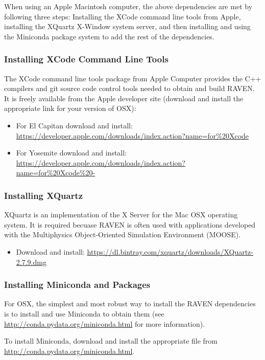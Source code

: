 When using an Apple Macintosh computer, the above dependencies are met
by following three steps: Installing the XCode command line tools from Apple,
installing the XQuartz  X-Window system server, and then installing and using the Miniconda
package system to add the rest of the dependencies.

\subsubsection{Installing XCode Command Line Tools}

The XCode command line tools package from Apple Computer provides the C++
compilers and git source code control tools needed to obtain and build RAVEN.
It is freely available from the Apple developer site (download and install the appropriate link
for your version of OSX):
\begin{itemize}
    \item For El Capitan download and install: \url{https://developer.apple.com/downloads/index.action?name=for%20Xcode}
    \item For Yosemite download and install:  \url{https://developer.apple.com/downloads/index.action?name=for%20Xcode%20-}
\end{itemize}

\subsubsection{Installing XQuartz}
XQuartz is an implementation of the X Server for the Mac OSX operating system.  It is required
becuase RAVEN is often used with applications developed with the Multiphysics
Object-Oriented Simulation Environment (MOOSE).
\begin{itemize}
    \item Download and install: \url{https://dl.bintray.com/xquartz/downloads/XQuartz-2.7.9.dmg}
\end{itemize}

\subsubsection{Installing Miniconda and Packages}
\label{miniconda}

For OSX, the simplest and most robust way to install the RAVEN dependencies
is to install and use Miniconda to obtain them (see \url{http://conda.pydata.org/miniconda.html} for more information).

To install Miniconda, download and install the appropriate file from \url{http://conda.pydata.org/miniconda.html}.

